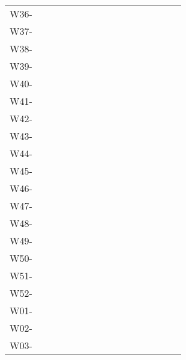 \documentclass{article}
\begin{document}
\begin{table}
  \centering
  \begin{tabular}{l c c c c c c c r c c c c c c c}
    W36-\hspace{2cm}  \\
    W37-\hspace{2cm}  \\
    W38-\hspace{2cm}  \\
    W39-\hspace{2cm}  \\
    W40-\hspace{2cm}  \\
    W41-\hspace{2cm}  \\
    W42-\hspace{2cm}  \\
    W43-\hspace{2cm}  \\
    W44-\hspace{2cm}  \\
    W45-\hspace{2cm}  \\
    W46-\hspace{2cm}  \\
    W47-\hspace{2cm}  \\
    W48-\hspace{2cm}  \\
    W49-\hspace{2cm}  \\
    W50-\hspace{2cm}  \\
    W51-\hspace{2cm}  \\
    W52-\hspace{2cm}  \\
    W01-\hspace{2cm}  \\
    W02-\hspace{2cm}  \\
    W03-\hspace{2cm}  \\
  \end{tabular}
\end{table}
\end{document}
